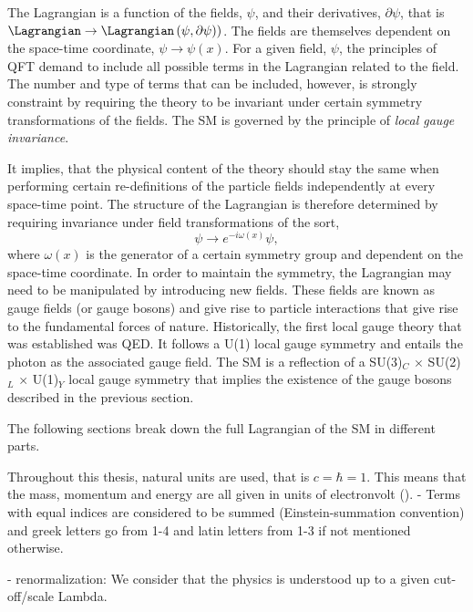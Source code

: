 The Lagrangian is a function of the fields, $\psi$, and their derivatives, $\partial \psi$, that is $\Lagrangian \rightarrow \Lagrangian\left(\psi, \partial\psi)\right)$. The fields are themselves dependent on the space-time coordinate, $\psi \rightarrow \psi(x)$. 
For a given field, $\psi$, the principles of QFT demand to include all possible terms in the Lagrangian related to the field. 
The number and type of terms that can be included, however, is strongly constraint by requiring the theory to be invariant under certain symmetry transformations of the fields. 
The SM is governed by the principle of \emph{local gauge invariance}. 

It implies, that the physical content of the theory should stay the same when performing certain re-definitions of the particle fields independently at every space-time point.
The structure of the Lagrangian is therefore determined by requiring invariance under field transformations of the sort,
\begin{equation}
  \psi \rightarrow e^{-i\omega(x)} \psi,
\end{equation}
where $\omega(x)$ is the generator of a certain symmetry group and dependent on the space-time coordinate. 
In order to maintain the symmetry, the Lagrangian may need to be manipulated by introducing new fields.
These fields are known as gauge fields (or gauge bosons) and give rise to particle interactions that give rise to the fundamental forces of nature. 
Historically, the first local gauge theory that was established was QED. It follows a U(1) local gauge symmetry and entails the photon as the associated gauge field. 
The SM is a reflection of a SU(3)$_C$ $\times$ SU(2)$_L$ $\times$ U(1)$_Y$ local gauge symmetry that implies the existence of the gauge bosons described in the previous section.

The following sections break down the full Lagrangian of the SM in different parts. 

Throughout this thesis, natural units are used, that is $c = \hbar = 1$. This means that the mass, momentum and energy are all given in units of electronvolt (\eV).
- Terms with equal indices are considered to be summed (Einstein-summation convention) and greek letters go from 1-4 and latin letters from 1-3 if not mentioned otherwise.

- renormalization:
We consider that the physics is understood up to a given cut-off/scale Lambda.


